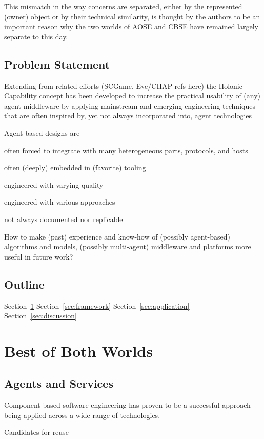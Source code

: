 \documentclass{aamas2015}
\newcommand{\sectionname}{Section}
\begin{document}
This mismatch in the way concerns are separated, either by the represented
(owner) object or by their technical similarity, is thought by the authors to be
an important reason why the two worlds of AOSE and CBSE have remained largely
separate to this day.

\subsection{Problem Statement}

Extending from related efforts (SCGame, Eve/CHAP refs here) the Holonic
Capability concept has been developed to increase the practical usability of
(any) agent middleware by applying mainstream and emerging engineering
techniques that are often inspired by, yet not always incorporated into, agent
technologies

Agent-based designs are

often forced to integrate with many heterogeneous parts, protocols, and hosts

often (deeply) embedded in (favorite) tooling

engineered with varying quality

engineered with various approaches

not always documented nor replicable

How to make (past) experience and know-how of (possibly agent-based) algorithms
and models, (possibly multi-agent) middleware and platforms more useful in future work?

\subsection{Outline}

\sectionname\ \ref{sec:theory}
\sectionname\ \ref{sec:framework}
\sectionname\ \ref{sec:application}
\sectionname\ \ref{sec:discussion}

\section{Best of Both Worlds}
\label{sec:theory}

\subsection{Agents and Services}
Component-based software engineering has proven to be a successful approach
being applied across a wide range of technologies.

Candidates for reuse
\end{document}

